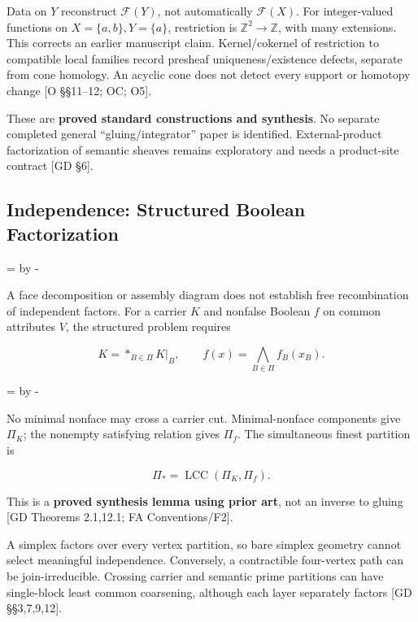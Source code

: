 \documentclass[10pt,letterpaper]{article}
\newcommand{\NeedDisplaySpace}{\par\begingroup\dimen0=\pagegoal\advance\dimen0 by -\pagetotal\ifdim\dimen0<8\baselineskip\newpage\fi\endgroup}
\begin{document}
Data on \(Y\) reconstruct \(\mathcal F(Y)\), not automatically \(\mathcal F(X)\). For integer-valued functions on \(X=\{a,b\},Y=\{a\}\), restriction is \(\mathbb Z^2\to\mathbb Z\), with many extensions. This corrects an earlier manuscript claim. Kernel/cokernel of restriction to compatible local families record presheaf uniqueness/existence defects, separate from cone homology. An acyclic cone does not detect every support or homotopy change [O \S{}\S{}11--12; OC; O5].\par

These are \textbf{proved standard constructions and synthesis}. No separate completed general ``gluing/integrator'' paper is identified. External-product factorization of semantic sheaves remains exploratory and needs a product-site contract [GD \S{}6].\par

\subsection*{Independence: Structured Boolean Factorization}

\NeedDisplaySpace
\begin{samepage}
A face decomposition or assembly diagram does not establish free recombination of independent factors. For a carrier \(K\) and nonfalse Boolean \(f\) on common attributes \(V\), the structured problem requires\par
\[
K=*_{B\in\Pi}K|_B,\qquad f(x)=\bigwedge_{B\in\Pi}f_B(x_B).
\]
\end{samepage}
\NeedDisplaySpace
\begin{samepage}
No minimal nonface may cross a carrier cut. Minimal-nonface components give \(\Pi_K\); the nonempty satisfying relation gives \(\Pi_f\). The simultaneous finest partition is\par
\[
\Pi_*=\operatorname{LCC}(\Pi_K,\Pi_f).
\]
\end{samepage}
This is a \textbf{proved synthesis lemma using prior art}, not an inverse to gluing [GD Theorems 2.1,12.1; FA Conventions/F2].\par

A simplex factors over every vertex partition, so bare simplex geometry cannot select meaningful independence. Conversely, a contractible four-vertex path can be join-irreducible. Crossing carrier and semantic prime partitions can have single-block least common coarsening, although each layer separately factors [GD \S{}\S{}3,7,9,12].\par
\end{document}
